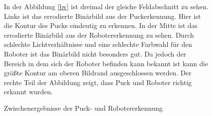 \begin{figure} [h]
 \caption{Zwischenergebnisse der Puck- und Robotererkennung}
 \label{bv_process}

In der Abbildung \ref{bv} ist dreimal der gleiche Feldabschnitt zu sehen. Links ist das errodierte Binärbild aus der Puckerkennung. Hier ist die Kontur des Pucks eindeutig zu erkennen. In der Mitte ist das errodierte Binärbild aus der Robotererkennung zu sehen. Durch schlechte Lichtverhältnisse und eine schlechte Farbwahl für den Roboter ist das Binärbild nicht besonders gut. Da jedoch der Bereich in dem sich der Roboter befinden kann bekannt ist kann die größte Kontur am oberen Bildrand ausgeschlossen werden. Der rechte Teil der Abbildung zeigt, dass Puck und Roboter richtig erkannt wurden.
\end{figure}